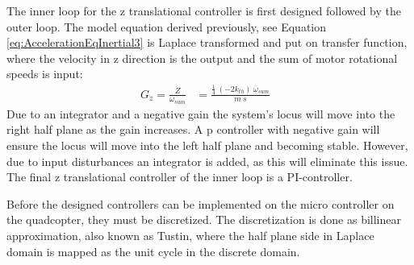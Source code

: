 The inner loop for the z translational controller is first designed followed by the outer loop.
The model equation derived previously, see Equation \ref{eq:AccelerationEqInertial3} is Laplace transformed and put on transfer function, where the velocity in z direction is the output and the sum of motor rotational speeds is input:
\begin{align}
G_{\dot{z}}=\frac{\dot{Z}}{\omega_{sum}} &= \frac{ \frac{1}{4}\ (-2 k_{th})\ \overline{\omega}_{sum} }{ m\ s } & \label{eq:linearTransferFunctionZ}
\end{align}
Due to an integrator and a negative gain the system's locus will move into the right half plane as the gain increases.
A p controller with negative gain will ensure the locus will move into the left half plane and becoming stable. However, due to input disturbances an integrator is added, as this will eliminate this issue. 
The final z translational controller of the inner loop is a PI-controller. 

Before the designed controllers can be implemented on the micro controller on the quadcopter, they must be discretized. 
The discretization is done as billinear approximation, also known as Tustin, where the half plane side in Laplace domain is mapped as the unit cycle in the discrete domain. 
